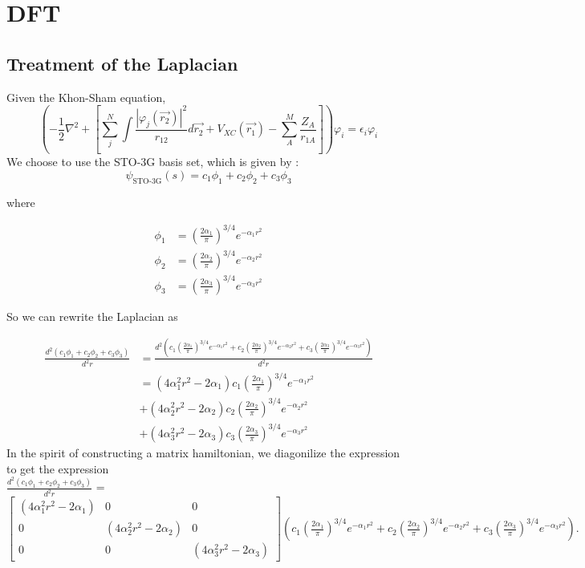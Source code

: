 \documentclass{article}
\begin{document}
\section{DFT}
\subsection{Treatment of the Laplacian}
Given the Khon-Sham equation, 
\[\left(-\frac{1}{2} \nabla^2 + \left[\sum_{j}^{N}\int \frac{|\varphi_j(\vec{r_2})|^2}{r_{12}}d\vec{r_2} + V_{XC}(\vec{r_1})- \sum_{A}^{M}\frac{Z_A}{r_{1A}} \right]\right)\varphi_i = \epsilon_i\varphi_i\]
We choose to use the STO-3G basis set, which is given by : 
\begin{equation*}
    \psi_{\text{STO-3G}}(s) = c_1 \phi_1 + c_2 \phi_2 + c_3 \phi_3
    \end{equation*}

where

    \begin{align*}
    \phi_1 &= \left( \frac{2\alpha_1}{\pi} \right)^{3/4} e^{-\alpha_1 r^2} \\
    \phi_2 &= \left( \frac{2\alpha_2}{\pi} \right)^{3/4} e^{-\alpha_2 r^2} \\
    \phi_3 &= \left( \frac{2\alpha_3}{\pi} \right)^{3/4} e^{-\alpha_3 r^2}
    \end{align*}

So we can rewrite the Laplacian as 

\begin{align*}
    \frac{d^2(c_1 \phi_1 + c_2 \phi_2 + c_3 \phi_3)}{d^2r} &= \frac{d^2(c_1  \left( \frac{2\alpha_1}{\pi} \right)^{3/4} e^{-\alpha_1 r^2} + c_2 \left( \frac{2\alpha_2}{\pi} \right)^{3/4} e^{-\alpha_2 r^2} + c_3 \left( \frac{2\alpha_3}{\pi} \right)^{3/4} e^{-\alpha_3 r^2})}{d^2r} \\
                                                           &= (4\alpha_1^2r^2 - 2\alpha_1)c_1  \left( \frac{2\alpha_1}{\pi} \right)^{3/4} e^{-\alpha_1 r^2} \\
                                                           &+(4\alpha_2^2r^2 - 2\alpha_2)c_2  \left( \frac{2\alpha_2}{\pi} \right)^{3/4} e^{-\alpha_2 r^2}  \\
                                                           &+(4\alpha_3^2r^2 - 2\alpha_3)c_3  \left( \frac{2\alpha_3}{\pi} \right)^{3/4} e^{-\alpha_3 r^2}
\end{align*}
In the spirit of constructing a matrix hamiltonian, we diagonilize the expression to get the expression \\
 \(\frac{d^2(c_1 \phi_1 + c_2 \phi_2 + c_3 \phi_3)}{d^2r}\) = \\
$\begin{bmatrix}
    (4\alpha_1^2r^2 - 2\alpha_1) & 0 & 0\\
    0 & (4\alpha_2^2r^2 - 2\alpha_2) & 0 \\
    0& 0& (4\alpha_3^2r^2 - 2\alpha_3)
\end{bmatrix} (c_1  \left( \frac{2\alpha_1}{\pi} \right)^{3/4} e^{-\alpha_1 r^2} + c_2 \left( \frac{2\alpha_2}{\pi} \right)^{3/4} e^{-\alpha_2 r^2} + c_3 \left( \frac{2\alpha_3}{\pi} \right)^{3/4} e^{-\alpha_3 r^2}).$
\end{document}
